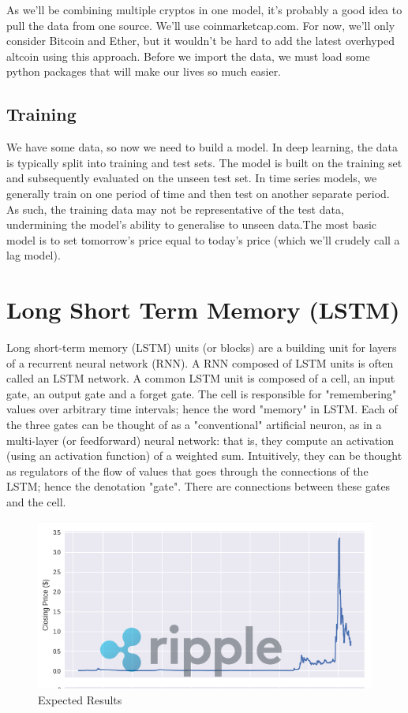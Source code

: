     As we’ll be combining multiple cryptos in one model, it’s probably a good idea to pull the data from one source. We’ll use coinmarketcap.com. For now, we’ll only consider Bitcoin and Ether, but it wouldn’t be hard to add the latest overhyped altcoin using this approach. Before we import the data, we must load some python packages that will make our lives so much easier.
    
    \subsection{Training}
    We have some data, so now we need to build a model. In deep learning, the data is typically split into training and test sets. The model is built on the training set and subsequently evaluated on the unseen test set. In time series models, we generally train on one period of time and then test on another separate period. 
    As such, the training data may not be representative of the test data, undermining the model’s ability to generalise to unseen data.The most basic model is to set tomorrow’s price equal to today’s price (which we’ll crudely call a lag model). 

    \section{Long Short Term Memory (LSTM)}
    Long short-term memory (LSTM) units (or blocks) are a building unit for layers of a recurrent neural network (RNN). A RNN composed of LSTM units is often called an LSTM network. A common LSTM unit is composed of a cell, an input gate, an output gate and a forget gate. The cell is responsible for "remembering" values over arbitrary time intervals; hence the word "memory" in LSTM. Each of the three gates can be thought of as a "conventional" artificial neuron, as in a multi-layer (or feedforward) neural network: that is, they compute an activation (using an activation function) of a weighted sum. Intuitively, they can be thought as regulators of the flow of values that goes through the connections of the LSTM; hence the denotation "gate". There are connections between these gates and the cell.
    \begin{figure}[ht]
        \centering \includegraphics[scale=0.7]{images/lstm.png}
        \caption{Expected Results}
    \end{figure}


